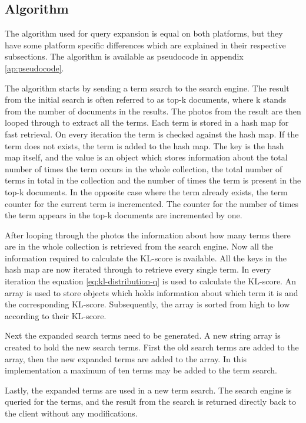 \subsection{Algorithm}
\label{sec:algorithm}
The algorithm used for query expansion is equal on both platforms,
but they have some platform specific differences which are explained in their respective subsections.
The algorithm is available as pseudocode in appendix \ref{ap:pseudocode}.

The algorithm starts by sending a term search to the search engine.
The result from the initial search is often referred to as top-k documents,
where k stands from the number of documents in the results.
The photos from the result are then looped through to extract all the terms.
Each term is stored in a hash map for fast retrieval.
On every iteration the term is checked against the hash map.
If the term does not exists,
the term is added to the hash map.
The key is the hash map itself,
and the value is an object which stores information about the total number of times the term occurs in the whole collection,
the total number of terms in total in the collection and the number of times the term is present in the top-k documents.
In the opposite case where the term already exists, the term counter for the current term is incremented.
The counter for the number of times the term appears in the top-k documents are incremented by one.

After looping through the photos the information about how many terms there are in the whole collection is retrieved from the search engine.
Now all the information required to calculate the KL-score is available.
All the keys in the hash map are now iterated through to retrieve every single term.
In every iteration the equation \ref{eq:kl-distribution-q} is used to calculate the KL-score.
An array is used to store objects which holds information about which term it is and the corresponding KL-score.
Subsequently, the array is sorted from high to low according to their KL-score.

Next the expanded search terms need to be generated.
A new string array is created to hold the new search terms.
First the old search terms are added to the array,
then the new expanded terms are added to the array.
In this implementation a maximum of ten terms may be added to the term search.

Lastly, the expanded terms are used in a new term search.
The search engine is queried for the terms,
and the result from the search is returned directly back to the client without any modifications.

